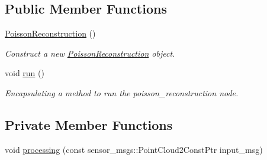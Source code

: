\subsection*{Public Member Functions}
\begin{DoxyCompactItemize}
\item 
\hyperlink{classpoisson__reconstruction__node_1_1_poisson_reconstruction_acda9fc43d3789cb5ab53ebb305841afc}{Poisson\+Reconstruction} ()
\begin{DoxyCompactList}\small\item\em Construct a new \hyperlink{classpoisson__reconstruction__node_1_1_poisson_reconstruction}{Poisson\+Reconstruction} object. \end{DoxyCompactList}\item 
void \hyperlink{classpoisson__reconstruction__node_1_1_poisson_reconstruction_a4332de0505ba34082e8371a529731b6f}{run} ()
\begin{DoxyCompactList}\small\item\em Encapsulating a method to run the poisson\+\_\+reconstruction node. \end{DoxyCompactList}\end{DoxyCompactItemize}
\subsection*{Private Member Functions}
\begin{DoxyCompactItemize}
\item 
void \hyperlink{classpoisson__reconstruction__node_1_1_poisson_reconstruction_a7b079c1e99540c4e3971fb0139afd55b}{processing} (const sensor\+\_\+msgs\+::\+Point\+Cloud2\+Const\+Ptr input\+\_\+msg)
\end{DoxyCompactItemize}
